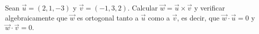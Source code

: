 Sean $\vec{u} = (2, 1, -3)$ y $\vec{v} = (-1, 3, 2)$. Calcular $\vec{w} = \vec{u} \times \vec{v}$ y verificar algebraicamente que $\vec{w}$ es ortogonal tanto a $\vec{u}$ como a $\vec{v}$, es decir, que $\vec{w} \cdot \vec{u} = 0$ y $\vec{w} \cdot \vec{v} = 0$.